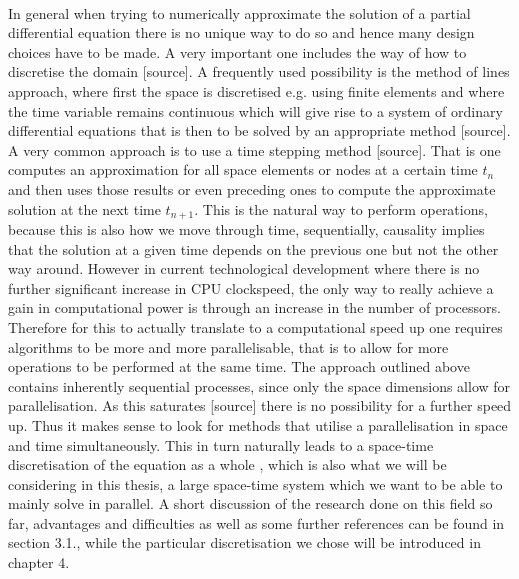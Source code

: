 \documentclass[../draft_1.tex]{subfiles}
\begin{document}
\smallskip
\\
In general when trying to numerically approximate the solution of a partial differential equation there is no unique way to do so and hence many design choices have to be made. A very important one includes the way of how to discretise the domain [source]. A frequently used possibility is the method of lines approach, where first the space is discretised e.g. using finite elements and where the time variable remains continuous which will give rise to a system of ordinary differential equations that is then to be solved by an appropriate method [source]. A very common approach is to use a time stepping method [source]. That is one computes an approximation for all space elements or nodes at a certain time $t_n$ and then uses those results or even preceding ones to compute the approximate solution at the next time $t_{n+1}$. This is the natural way to perform operations, because this is also how we move through time, sequentially, causality implies that the solution at a given time depends on the previous one but not the other way around. 
However in current technological development where there is no further significant increase in CPU clockspeed, the only way to really achieve a gain in computational power is through an increase in the number of processors. Therefore for this to actually translate to a computational speed up one requires algorithms to be more and more parallelisable, that is to allow for more operations to be performed at the same time. The approach outlined above contains inherently sequential processes, since only the space dimensions allow for parallelisation. As this saturates [source] there is no possibility for a further speed up. Thus it makes sense to look for methods that utilise a parallelisation in space and time simultaneously. This in turn naturally leads to a space-time discretisation of the equation as a whole \cite{gander201550}, which is also what we will be considering in this thesis, a large space-time system which we want to be able to mainly solve in parallel. A short discussion of the research done on this field so far, advantages and difficulties as well as some further references can be found in section 3.1., while the particular discretisation we chose will be introduced in chapter 4.
\bigskip
\\
\end{document}

